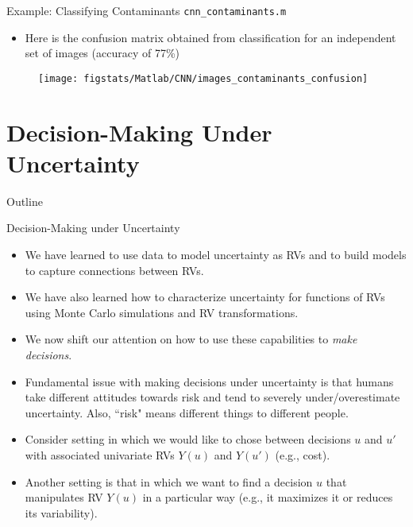 \documentclass[handout,9pt]{beamer}
\begin{document}
\begin{frame}{Example: Classifying Contaminants \footnotesize{\texttt{cnn\_contaminants.m}}}

\begin{itemize}
\item Here is the confusion matrix obtained from classification for an independent set of images (accuracy of 77\%)
\end{itemize}

\begin{figure}[!htb]
    \centering
\texttt{[image: figstats/Matlab/CNN/images\_contaminants\_confusion]}
\end{figure}

\end{frame}

\section{Decision-Making Under Uncertainty}
\begin{frame}{Outline}
\tableofcontents[currentsection]
\end{frame}

%
\begin{frame}{Decision-Making under Uncertainty}
\begin{itemize}
   \setlength{\itemsep}{10pt}
\item We have learned to use data to model uncertainty as RVs and to build models to capture connections between RVs. 
\item We have also learned how to characterize uncertainty for functions of RVs using Monte Carlo simulations and RV transformations. 

\item We now shift our attention on how to use these capabilities to {\em make decisions}. 

\item Fundamental issue with making decisions under uncertainty is that humans take different attitudes towards risk and tend to severely under/overestimate uncertainty. Also, ``risk" means different things to different people. 

\item Consider setting in which we would like to chose between decisions $u$ and $u'$ with associated univariate RVs $Y(u)$ and $Y(u')$ (e.g., cost). 

\item Another setting is that in which we want to find a decision $u$ that manipulates RV $Y(u)$ in a particular way (e.g., it maximizes it or reduces its variability). 

\end{itemize}

\end{frame}
\end{document}
